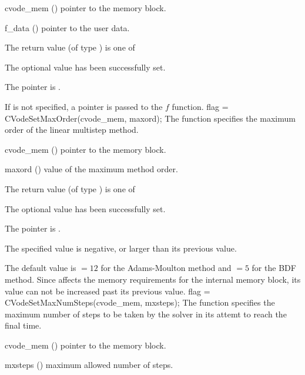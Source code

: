 {
  \begin{args}
  \item[cvode\_mem] ()
    pointer to the {\cvode} memory block.
  \item[f\_data] ()
    pointer to the user data.
  \end{args}
}
{
  The return value  (of type ) is one of
  \begin{args}
  \item[\Id{SUCCESS}] 
    The optional value has been successfully set.
  \item[\Id{CVS\_NO\_MEM}]
    The  pointer is .
  \end{args}
}
{
  If  is not specified, a  pointer is
  passed to the $f$ function.
}
{
flag = CVodeSetMaxOrder(cvode\_mem, maxord);
}
{
  The function  specifies the maximum order of the 
  linear multistep method.
}
{
  \begin{args}
  \item[cvode\_mem] ()
    pointer to the {\cvode} memory block.
  \item[maxord] ()
    value of the maximum method order.
  \end{args}
}
{
  The return value  (of type ) is one of
  \begin{args}
  \item[\Id{SUCCESS}] 
    The optional value has been successfully set.
  \item[\Id{CVS\_NO\_MEM}]
    The  pointer is .
  \item[\Id{CVS\_ILL\_INPUT}]
    The specified value  is negative, or larger than 
    its previous value.
  \end{args}
}
{
  The default value is $= 12$ for
  the Adams-Moulton method and $= 5$
  for the BDF method.
  Since  affects the memory requirements
  for the internal {\cvode} memory block, its value
  can not be increased past its previous value.
}
{
flag = CVodeSetMaxNumSteps(cvode\_mem, mxsteps);
}
{
  The function  specifies the maximum number
  of steps to be taken by the solver in its attemt to reach 
  the final time.
}
{
  \begin{args}
  \item[cvode\_mem] ()
    pointer to the {\cvode} memory block.
  \item[mxsteps] ()
    maximum allowed number of steps.
  \end{args}
}
